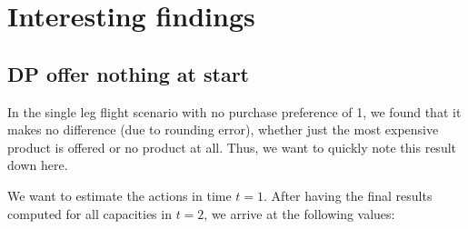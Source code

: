 

\chapter{Interesting findings}

\section{DP offer nothing at start}

In the single leg flight scenario with no purchase preference of 1, we found that it makes no difference (due to rounding error), whether just the most expensive product is offered or no product at all. Thus, we want to quickly note this result down here. 

We want to estimate the actions in time $t = 1$. After having the final results computed for all capacities in $t=2$, we arrive at the following values:

